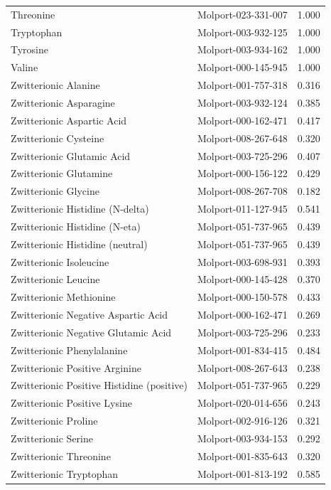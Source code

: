 \documentclass[a4paper,11pt]{article}\usepackage[]{graphicx}\usepackage[]{xcolor}
\begin{document}
\begin{enumerate}
\begin{table}[H]
\begin{tabular}[t]{llr}
Threonine & Molport-023-331-007 & 1.000\\
Tryptophan & Molport-003-932-125 & 1.000\\
Tyrosine & Molport-003-934-162 & 1.000\\
Valine & Molport-000-145-945 & 1.000\\
Zwitterionic Alanine & Molport-001-757-318 & 0.316\\
Zwitterionic Asparagine & Molport-003-932-124 & 0.385\\
Zwitterionic Aspartic Acid & Molport-000-162-471 & 0.417\\
Zwitterionic Cysteine & Molport-008-267-648 & 0.320\\
Zwitterionic Glutamic Acid & Molport-003-725-296 & 0.407\\
Zwitterionic Glutamine & Molport-000-156-122 & 0.429\\
Zwitterionic Glycine & Molport-008-267-708 & 0.182\\
Zwitterionic Histidine (N-delta) & Molport-011-127-945 & 0.541\\
Zwitterionic Histidine (N-eta) & Molport-051-737-965 & 0.439\\
Zwitterionic Histidine (neutral) & Molport-051-737-965 & 0.439\\
Zwitterionic Isoleucine & Molport-003-698-931 & 0.393\\
Zwitterionic Leucine & Molport-000-145-428 & 0.370\\
Zwitterionic Methionine & Molport-000-150-578 & 0.433\\
Zwitterionic Negative Aspartic Acid & Molport-000-162-471 & 0.269\\
Zwitterionic Negative Glutamic Acid & Molport-003-725-296 & 0.233\\
Zwitterionic Phenylalanine & Molport-001-834-415 & 0.484\\
Zwitterionic Positive Arginine & Molport-008-267-643 & 0.238\\
Zwitterionic Positive Histidine (positive) & Molport-051-737-965 & 0.229\\
Zwitterionic Positive Lysine & Molport-020-014-656 & 0.243\\
Zwitterionic Proline & Molport-002-916-126 & 0.321\\
Zwitterionic Serine & Molport-003-934-153 & 0.292\\
Zwitterionic Threonine & Molport-001-835-643 & 0.320\\
Zwitterionic Tryptophan & Molport-001-813-192 & 0.585\\

\end{tabular}
\end{table}
\end{enumerate}
\end{document}
